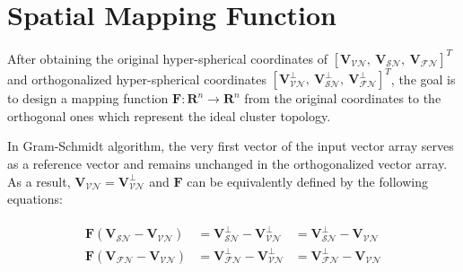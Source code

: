 \section{Spatial Mapping Function}
After obtaining the original hyper-spherical coordinates of $[\mathbf{V}_{\mathcal{VN}},~\mathbf{V}_{\mathcal{SN}},~\mathbf{V}_{\mathcal{FN}}]^T$ and orthogonalized hyper-spherical coordinates $[\mathbf{V}_{\mathcal{VN}}^{\perp},~\mathbf{V}_{\mathcal{SN}}^{\perp},~\mathbf{V}_{\mathcal{FN}}^{\perp}]^T$, the goal is to design a mapping function $\mathbf{F}: \mathbf{R}^n \to \mathbf{R}^n$ from the original coordinates to the orthogonal ones which represent the ideal cluster topology.

In Gram-Schmidt algorithm, the very first vector of the input vector array serves as a reference vector and remains unchanged in the orthogonalized vector array. As a result, $\mathbf{V}_{\mathcal{VN}} = \mathbf{V}_{\mathcal{VN}}^{\perp}$ and $\mathbf{F}$ can be equivalently defined by the following equations:

\begin{align}
\label{eq:constraints}
\begin{aligned}
\mathbf{F}(\mathbf{V}_{\mathcal{SN}} - \mathbf{V}_{\mathcal{VN}}) &= \mathbf{V}_{\mathcal{SN}}^{\perp} - \mathbf{V}_{\mathcal{VN}}^{\perp} &= \mathbf{V}_{\mathcal{SN}}^{\perp} - \mathbf{V}_{\mathcal{VN}}\\
\mathbf{F}(\mathbf{V}_{\mathcal{FN}} - \mathbf{V}_{\mathcal{VN}}) &= \mathbf{V}_{\mathcal{FN}}^{\perp} - \mathbf{V}_{\mathcal{VN}}^{\perp} &= \mathbf{V}_{\mathcal{FN}}^{\perp} - \mathbf{V}_{\mathcal{VN}}
\end{aligned}
\end{align}

